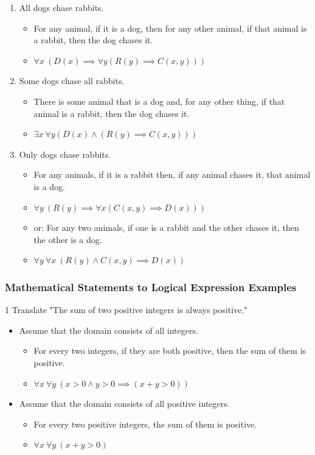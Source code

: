 \documentclass[12pt, letterpaper]{article}
\newcommand{\exheader}[1][ex]{{\tiny{#1}\normalsize}}
\begin{document}
\begin{enumerate}
	\item All dogs chase rabbits.
	\begin{itemize}[leftmargin=0.3cm, label={\faAngleRight}]
		\item For any animal, if it is a dog, then for any other animal, if that animal is a rabbit, then the dog chases it.
		\item $\forall x \ (D(x) \implies \forall y (R(y) \implies C(x,y)))$
	\end{itemize}
	\item Some dogs chase all rabbits.
	\begin{itemize}[leftmargin=0.3cm, label={\faAngleRight}]
		\item There is some animal that is a dog and, for any other thing, if that animal is a rabbit, then the dog chases it.
		\item $\exists x \ \forall y (D(x) \land (R(y) \implies C(x,y)))$
	\end{itemize}
	\item Only dogs chase rabbits.
	\begin{itemize}[leftmargin=0.3cm, label={\faAngleRight}]
		\item For any animals, if it is a rabbit then, if any animal chases it, that animal is a dog.
		\item $\forall y \ (R(y) \implies \forall x (C(x,y) \implies D(x)))$
		\item or: For any two animals, if one is a rabbit and the other chases it, then the other is a dog.
		\item $\forall y \ \forall x \ (R(y) \land C(x,y) \implies D(x))$
	\end{itemize}
\end{enumerate}
\pagebreak
\subsubsection*{Mathematical Statements to Logical Expression Examples}
\bigbreak

\exheader[1] Translate "The sum of two positive integers is always positive." 
\begin{itemize}[leftmargin=*, label={}]
	\item Assume that the domain consists of all integers.
	\begin{itemize}
		\item For every two integers, if they are both positive, then the sum of them is positive.
		\item $\forall x \ \forall y \ (x > 0 \land y > 0 \implies (x + y > 0))$
	\end{itemize}
	\item Assume that the domain consists of all positive integers.
	\begin{itemize}
		\item For every two positive integers, the sum of them is positive.
		\item $\forall x \ \forall y \ (x+y>0)$
	\end{itemize}
\end{itemize}
\end{document}
